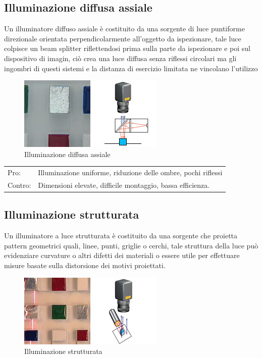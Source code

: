 \subsection{Illuminazione diffusa assiale}
Un illuminatore diffuso assiale  è costituito da una 
sorgente di luce puntiforme direzionale orientata 
perpendicolarmente all’oggetto da ispezionare, tale luce 
colpisce un beam splitter riflettendosi prima sulla parte da 
ispezionare e poi sul dispositivo di imagin, ciò crea una 
luce diffusa senza riflessi circolari ma gli  ingombri di 
questi sistemi e la distanza di esercizio limitata ne 
vincolano l’utilizzo 
\begin{figure}[!h]
\centering
\includegraphics[width=.3\textwidth]{img/illuminazione-diffusa-assiale.jpg}
\caption{Illuminazione diffusa assiale}\label{fig:illuminazione-diffusa-assiale}
\end{figure}



\begin{centering}

\begin{tabular}{l l}
Pro: &  Illuminazione uniforme, riduzione delle ombre, pochi riflessi \\
Contro: &  Dimensioni elevate, difficile montaggio, bassa efficienza.\\
\end{tabular}
\end{centering}


\subsection{Illuminazione strutturata}
Un illuminatore a luce strutturata è costituito da una sorgente che proietta
pattern geometrici quali, linee, punti, griglie o cerchi, tale struttura della
luce può evidenziare curvature o altri difetti dei materiali o essere utile 
per effettuare misure basate sulla distorsione dei motivi proiettati.

\begin{figure}[!h]
\centering
\includegraphics[width=.3\textwidth]{img/illuminazione-strutturata.jpg}
\caption{Illuminazione strutturata}\label{fig:illuminazione-strutturata}
\end{figure}



